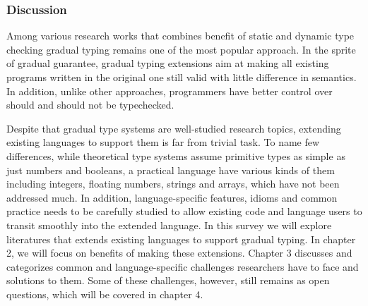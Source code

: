 \subsubsection{Discussion}

Among various research works that combines
benefit of static and dynamic type checking
gradual typing remains one of the most popular approach.
In the sprite of gradual guarantee, gradual typing extensions aim at
making all existing programs written in the original one still valid with little difference in semantics.
In addition, unlike other approaches, programmers have better control over should and should not be typechecked.

Despite that gradual type systems are well-studied research topics,
extending existing languages to support them is far from trivial task.
To name few differences, while theoretical type systems assume primitive types as simple as just numbers and booleans,
a practical language have various kinds of them including integers, floating numbers, strings and arrays,
which have not been addressed much.
In addition, language-specific features, idioms and common practice needs
to be carefully studied to allow existing code and language users to transit smoothly into
the extended language. In this survey we will explore literatures that extends existing languages to support gradual typing.
In chapter 2, we will focus on benefits of making these extensions. Chapter 3 discusses and categorizes common and language-specific
challenges researchers have to face and solutions to them.
Some of these challenges, however, still remains as open questions, which will be covered in chapter 4.

